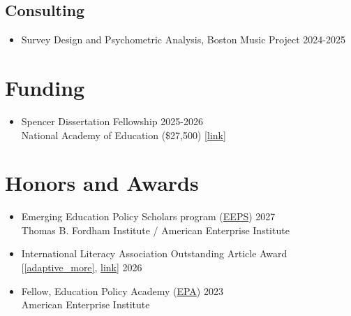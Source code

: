 \documentclass[11pt]{article}
\begin{document}
\subsection{Consulting}

\begin{itemize}
    \item     Survey Design and Psychometric Analysis, Boston Music Project \hfill 2024-2025
\end{itemize}







\section{Funding}

\begin{itemize}
    \item Spencer Dissertation Fellowship \hfill 2025-2026 \\ National Academy of Education (\$27,500) [\href{https://naeducation.org/awardee/joshua-gilbert/}{link}]
\end{itemize}
  
\section{Honors and Awards}

\begin{itemize}
    \item Emerging Education Policy Scholars program (\href{https://fordhaminstitute.org/national/scholars}{EEPS}) \hfill 2027 \\ Thomas B. Fordham Institute / American Enterprise Institute
    \item International Literacy Association Outstanding Article Award [\ref{adaptive_more}, \href{https://www.literacyworldwide.org/get-involved/awards-recognition/awards-grants/outstanding-article-award-reading-research-quarterly}{link}] \hfill 2026
    \item Fellow, Education Policy Academy (\href{https://www.aei.org/education-policy-academy/}{EPA}) \hfill 2023 \\American Enterprise Institute
\end{itemize}
\end{document}
